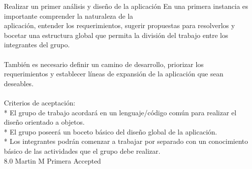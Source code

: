 \vspace{20pt}

	{Realizar un primer análisis y diseño de la aplicación} %
	{En una primera instancia es importante comprender la naturaleza de la\\
aplicación, entender los requerimientos, sugerir propuestas para resolverlos y\\
bocetar una estructura global que permita la división del trabajo entre los\\
integrantes del grupo.\\
  \\
También es necesario definir un camino de desarrollo, priorizar los\\
requerimientos y establecer líneas de expansión de la aplicación que sean\\
deseables.\\
  \\
Criterios de aceptación:\\
* El grupo de trabajo acordará en un lenguaje/código común para realizar el diseño orientado a objetos.  \\
* El grupo poseerá un boceto básico del diseño global de la aplicación.  \\
* Los integrantes podrán comenzar a trabajar por separado con un conocimiento básico de las actividades que el grupo debe realizar.  \\
} %
	{} %
	{8.0} %
	{Martin M} %
	{Primera} %
	{Accepted} %


\vspace{20pt}

